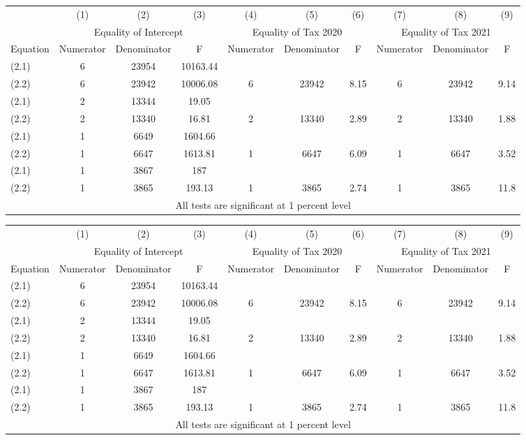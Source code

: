 \begin{tabular}{lccccccccc} \hline
	& (1) & (2) & (3) & (4) & (5) & (6)  & (7) & (8) & (9) \\
	&\multicolumn{3}{c}{Equality of Intercept} &\multicolumn{3}{c}{Equality of Tax 2020} &\multicolumn{3}{c}{Equality of Tax 2021}\\
Equation&Numerator&Denominator&F&Numerator&Denominator&F&Numerator&Denominator&F \\
(2.1)&6&23954&10163.44\\
(2.2)&6&23942&10006.08&6&23942&8.15&6&23942&9.14\\
(2.1)&2&13344&19.05\\
(2.2)&2&13340&16.81&2&13340&2.89&2&13340&1.88\\
(2.1)&1&6649&1604.66\\
(2.2)&1&6647&1613.81&1&6647&6.09&1&6647&3.52\\
(2.1)&1&3867&187\\
(2.2)&1&3865&193.13&1&3865&2.74&1&3865&11.8\\
 \hline
 \multicolumn{10}{c}{ All tests are significant at 1 percent level} \\
\end{tabular}

\begin{tabular}{lccccccccc} \hline
	& (1) & (2) & (3) & (4) & (5) & (6)  & (7) & (8) & (9) \\
	&\multicolumn{3}{c}{Equality of Intercept} &\multicolumn{3}{c}{Equality of Tax 2020} &\multicolumn{3}{c}{Equality of Tax 2021}\\
	Equation&Numerator&Denominator&F&Numerator&Denominator&F&Numerator&Denominator&F\\
	(2.1)&6&23954&10163.44\\
	(2.2)&6&23942&10006.08&6&23942&8.15&6&23942&9.14\\
	(2.1)&2&13344&19.05\\
	(2.2)&2&13340&16.81&2&13340&2.89&2&13340&1.88\\
	(2.1)&1&6649&1604.66\\
	(2.2)&1&6647&1613.81&1&6647&6.09&1&6647&3.52\\
	(2.1)&1&3867&187\\
	(2.2)&1&3865&193.13&1&3865&2.74&1&3865&11.8\\
	\hline
	\multicolumn{10}{c}{ All tests are significant at 1 percent level} \\
\end{tabular}
